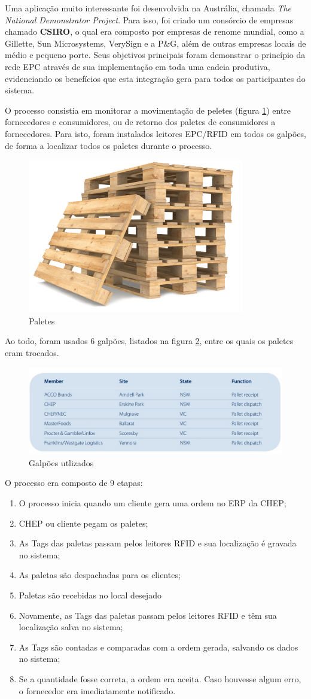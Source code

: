 	Uma aplicação muito interessante foi desenvolvida na Austrália, chamada \textit{The National Demonstrator Project}. Para isso, foi criado um consórcio de empresas chamado \textbf{CSIRO}, o qual era composto por empresas de renome mundial, como a Gillette, Sun Microsystems, VerySign e a P\&G, além de outras empresas locais de médio e pequeno porte. Seus objetivos principais foram demonstrar o princípio da rede EPC através de sua implementação em toda uma cadeia produtiva, evidenciando os benefícios que esta integração gera para todos os participantes do sistema. 
	
	O processo consistia em monitorar a movimentação de peletes (figura \ref{fig:palete}) entre fornecedores e consumidores, ou de retorno dos paletes de consumidores a fornecedores. Para isto, foram instalados leitores EPC/RFID em todos os galpões, de forma a localizar todos os paletes durante o processo.
	
	\begin{figure}[h!]
		\centering
		\includegraphics[width=0.2\linewidth]{pallet}
		\caption{Paletes}
		\label{fig:palete}
	\end{figure}

	Ao todo, foram usados 6 galpões, listados na figura \ref{fig:sites}, entre os quais os paletes eram trocados.
	
	\begin{figure}[h!]
		\centering
		\includegraphics[width=0.6\linewidth]{sites}
		\caption{Galpões utlizados}
		\label{fig:sites}
	\end{figure}
		
	 
	O processo era composto de 9 etapas:
	\begin{enumerate}
		\item O processo inicia quando um cliente gera uma ordem no ERP da CHEP;  
		\item CHEP ou cliente pegam os paletes;
		\item As Tags das paletas passam pelos leitores RFID e sua localização é gravada no sistema;
		\item As paletas são despachadas para os clientes;
		\item Paletas são recebidas no local desejado
		\item Novamente, as Tags das paletas passam pelos leitores RFID e têm sua localização salva no sistema;
		\item As Tags são contadas e comparadas com a ordem gerada, salvando os dados no sistema;
		\item Se a quantidade fosse correta, a ordem era aceita. Caso houvesse algum erro, o fornecedor era imediatamente notificado.
	\end{enumerate}	
	

